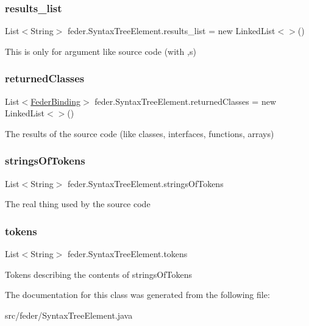 \subsubsection{\texorpdfstring{results\+\_\+list}{results\_list}}
{\footnotesize\ttfamily List$<$String$>$ feder.\+Syntax\+Tree\+Element.\+results\+\_\+list = new Linked\+List$<$$>$()}

This is only for argument like source code (with \textquotesingle{},\textquotesingle{}s) \mbox{\label{classfeder_1_1SyntaxTreeElement_ac46377f158537e18b24d6cbe149b22e2}} 
\subsubsection{\texorpdfstring{returned\+Classes}{returnedClasses}}
{\footnotesize\ttfamily List$<$\hyperlink{classfeder_1_1types_1_1FederBinding}{Feder\+Binding}$>$ feder.\+Syntax\+Tree\+Element.\+returned\+Classes = new Linked\+List$<$$>$()}

The results of the source code (like classes, interfaces, functions, arrays) \mbox{\label{classfeder_1_1SyntaxTreeElement_af2b1da7d86435877aeaaa596757c9024}} 
\subsubsection{\texorpdfstring{strings\+Of\+Tokens}{stringsOfTokens}}
{\footnotesize\ttfamily List$<$String$>$ feder.\+Syntax\+Tree\+Element.\+strings\+Of\+Tokens}

The real thing used by the source code \mbox{\label{classfeder_1_1SyntaxTreeElement_a182c15de3f81dc29277f2f0ed0cdbc75}} 
\subsubsection{\texorpdfstring{tokens}{tokens}}
{\footnotesize\ttfamily List$<$String$>$ feder.\+Syntax\+Tree\+Element.\+tokens}

Tokens describing the contents of strings\+Of\+Tokens 

The documentation for this class was generated from the following file\+:\begin{DoxyCompactItemize}
\item 
src/feder/Syntax\+Tree\+Element.\+java\end{DoxyCompactItemize}
